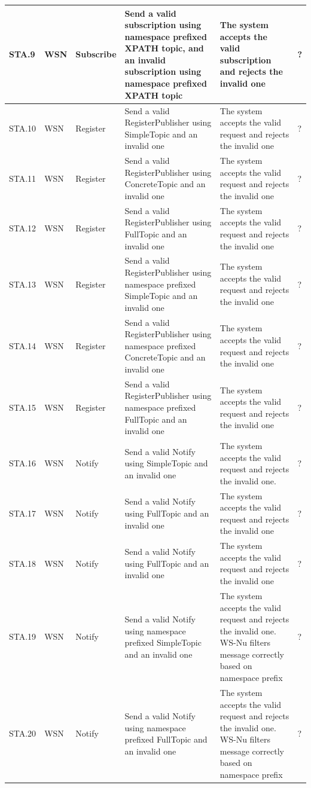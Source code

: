 \begin{table}[ht!]
\begin{tabular}{|m{0.5cm}|m{1.2cm}|m{1.2cm}|m{3.3cm}|m{3.3cm}|m{1.5cm}|}
STA.9 & WSN & Subscribe & Send a valid subscription using namespace prefixed XPATH topic, and an invalid subscription using namespace prefixed XPATH topic & The system accepts the valid subscription and rejects the invalid one & ? \\ \hline
STA.10 & WSN & Register & Send a valid RegisterPublisher using SimpleTopic and an invalid one & The system accepts the valid request and rejects the invalid one & ? \\ \hline
STA.11 & WSN & Register & Send a valid RegisterPublisher using ConcreteTopic and an invalid one & The system accepts the valid request and rejects the invalid one & ? \\ \hline
STA.12 & WSN & Register & Send a valid RegisterPublisher using FullTopic and an invalid one & The system accepts the valid request and rejects the invalid one & ? \\ \hline
STA.13 & WSN & Register & Send a valid RegisterPublisher using namespace prefixed SimpleTopic and an invalid one & The system accepts the valid request and rejects the invalid one & ? \\ \hline
STA.14 & WSN & Register & Send a valid RegisterPublisher using namespace prefixed ConcreteTopic and an invalid one & The system accepts the valid request and rejects the invalid one & ? \\ \hline
STA.15 & WSN & Register & Send a valid RegisterPublisher using namespace prefixed FullTopic and an invalid one & The system accepts the valid request and rejects the invalid one & ? \\ \hline
STA.16 & WSN & Notify & Send a valid Notify using SimpleTopic and an invalid one & The system accepts the valid request and rejects the invalid one. & ? \\ \hline
STA.17 & WSN & Notify & Send a valid Notify using FullTopic and an invalid one & The system accepts the valid request and rejects the invalid one & ? \\ \hline
STA.18 & WSN & Notify & Send a valid Notify using FullTopic and an invalid one & The system accepts the valid request and rejects the invalid one & ? \\ \hline
STA.19 & WSN & Notify & Send a valid Notify using namespace prefixed SimpleTopic and an invalid one & The system accepts the valid request and rejects the invalid one. WS-Nu filters message correctly based on namespace prefix & ? \\ \hline
STA.20 & WSN & Notify & Send a valid Notify using namespace prefixed FullTopic and an invalid one & The system accepts the valid request and rejects the invalid one. WS-Nu filters message correctly based on namespace prefix & ? \\ \hline

\end{tabular}
\end{table}
